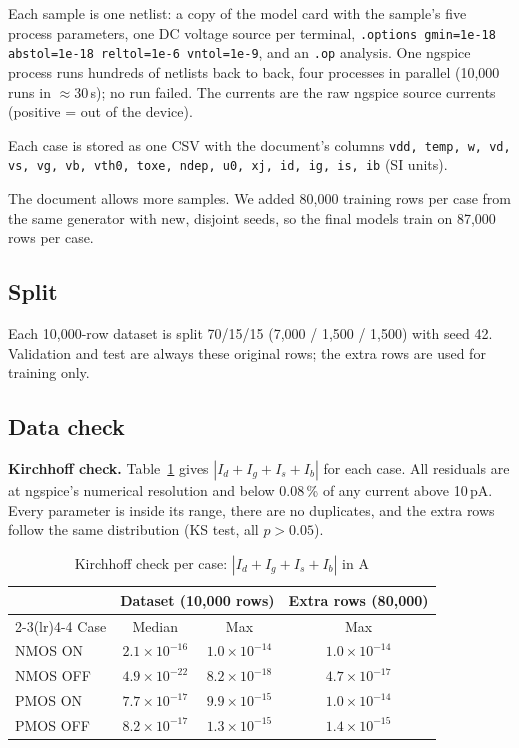 ﻿\documentclass[conference,10pt]{IEEEtran}
\newcommand{\cc}[1]{\texttt{#1}}
\newcommand{\pct}{\,\%}
\begin{document}
Each sample is one netlist: a copy of the model card with the sample's five process parameters,
one DC voltage source per terminal, \cc{.options gmin=1e-18 abstol=1e-18 reltol=1e-6 vntol=1e-9},
and an \cc{.op} analysis. One ngspice process runs hundreds of netlists back to back, four
processes in parallel (10,000 runs in $\approx$30\,s); no run failed. The currents are the raw
ngspice source currents (positive = out of the device).

Each case is stored as one CSV with the document's columns \cc{vdd, temp, w, vd, vs, vg, vb,
vth0, toxe, ndep, u0, xj, id, ig, is, ib} (SI units).

The document allows more samples. We added 80,000 training rows per case from the same generator
with new, disjoint seeds, so the final models train on 87,000 rows per case.

\subsection{Split}
Each 10,000-row dataset is split 70/15/15 (7,000 / 1,500 / 1,500) with seed 42. Validation and
test are always these original rows; the extra rows are used for training only.

\subsection{Data check}
\textbf{Kirchhoff check.} Table~\ref{tab:kcl} gives $|I_d+I_g+I_s+I_b|$ for each case. All
residuals are at ngspice's numerical resolution and below 0.08\pct{} of any current above
10\,pA. Every parameter is inside its range, there are no duplicates, and the extra rows follow
the same distribution (KS test, all $p>0.05$).

\begin{table}[!htb]
\caption{Kirchhoff check per case: $|I_d+I_g+I_s+I_b|$ in A}
\label{tab:kcl}
\centering
\footnotesize
\begin{tabular}{@{}lccc@{}}
\toprule
 & \multicolumn{2}{c}{Dataset (10,000 rows)} & Extra rows (80,000)\\
\cmidrule(lr){2-3}\cmidrule(lr){4-4}
Case & Median & Max & Max\\
\midrule
NMOS ON & $2.1\times10^{-16}$ & $1.0\times10^{-14}$ & $1.0\times10^{-14}$\\
NMOS OFF & $4.9\times10^{-22}$ & $8.2\times10^{-18}$ & $4.7\times10^{-17}$\\
PMOS ON & $7.7\times10^{-17}$ & $9.9\times10^{-15}$ & $1.0\times10^{-14}$\\
PMOS OFF & $8.2\times10^{-17}$ & $1.3\times10^{-15}$ & $1.4\times10^{-15}$\\
\bottomrule
\end{tabular}
\end{table}
\end{document}
